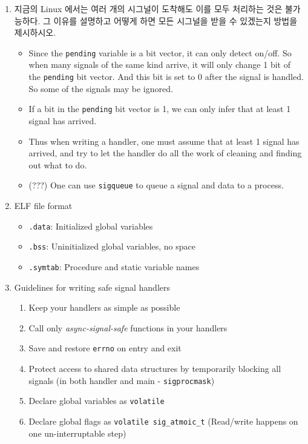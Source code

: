 \documentclass[12pt]{article}
\begin{document}
{\begin{enumerate}
\item 지금의 Linux 에서는 여러 개의 시그널이 도착해도 이를 모두 처리하는 것은 불가능하다. 그 이유를 설명하고 어떻게 하면 모든 시그널을 받을 수 있겠는지 방법을 제시하시오.
\begin{itemize}
	\item Since the \texttt{pending} variable is a bit vector, it can only detect on/off. So when many signals of the same kind arrive, it will only change 1 bit of the \texttt{pending} bit vector. And this bit is set to 0 after the signal is handled. So some of the signals may be ignored.
	\item If a bit in the \texttt{pending} bit vector is 1, we can only infer that at least 1 signal has arrived.
	\item Thus when writing a handler, one must assume that at least 1 signal has arrived, and try to let the handler do all the work of cleaning and finding out what to do.
	\item (???) One can use \texttt{sigqueue} to queue a signal and data to a process.
\end{itemize}

\item ELF file format
\begin{itemize}
	\item \texttt{.data}: Initialized global variables
	\item \texttt{.bss}: Uninitialized global variables, no space
	\item \texttt{.symtab}: Procedure and static variable names
\end{itemize}

\item Guidelines for writing safe signal handlers
\begin{enumerate}
	\item Keep your handlers as simple as possible
	\item Call only \textit{async-signal-safe} functions in your handlers
	\item Save and restore \texttt{errno} on entry and exit
	\item Protect access to shared data structures by temporarily blocking all signals (in both handler and main - \texttt{sigprocmask})
	\item Declare global variables as \texttt{volatile}
	\item Declare global flags as \texttt{volatile sig\_atmoic\_t} (Read/write happens on one un-interruptable step)
\end{enumerate}


\end{enumerate}}
\end{document}
